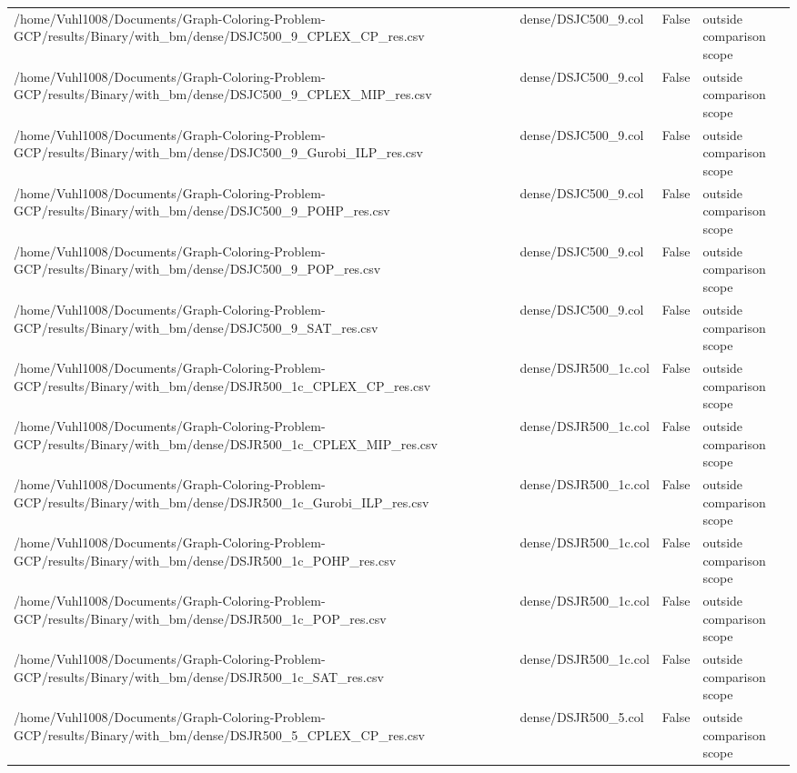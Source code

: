 \begin{table}[htbp]
\begin{tabular}{llll}
/home/Vuhl1008/Documents/Graph-Coloring-Problem-GCP/results/Binary/with\_bm/dense/DSJC500\_9\_CPLEX\_CP\_res.csv & dense/DSJC500\_9.col & False & outside comparison scope \\
/home/Vuhl1008/Documents/Graph-Coloring-Problem-GCP/results/Binary/with\_bm/dense/DSJC500\_9\_CPLEX\_MIP\_res.csv & dense/DSJC500\_9.col & False & outside comparison scope \\
/home/Vuhl1008/Documents/Graph-Coloring-Problem-GCP/results/Binary/with\_bm/dense/DSJC500\_9\_Gurobi\_ILP\_res.csv & dense/DSJC500\_9.col & False & outside comparison scope \\
/home/Vuhl1008/Documents/Graph-Coloring-Problem-GCP/results/Binary/with\_bm/dense/DSJC500\_9\_POHP\_res.csv & dense/DSJC500\_9.col & False & outside comparison scope \\
/home/Vuhl1008/Documents/Graph-Coloring-Problem-GCP/results/Binary/with\_bm/dense/DSJC500\_9\_POP\_res.csv & dense/DSJC500\_9.col & False & outside comparison scope \\
/home/Vuhl1008/Documents/Graph-Coloring-Problem-GCP/results/Binary/with\_bm/dense/DSJC500\_9\_SAT\_res.csv & dense/DSJC500\_9.col & False & outside comparison scope \\
/home/Vuhl1008/Documents/Graph-Coloring-Problem-GCP/results/Binary/with\_bm/dense/DSJR500\_1c\_CPLEX\_CP\_res.csv & dense/DSJR500\_1c.col & False & outside comparison scope \\
/home/Vuhl1008/Documents/Graph-Coloring-Problem-GCP/results/Binary/with\_bm/dense/DSJR500\_1c\_CPLEX\_MIP\_res.csv & dense/DSJR500\_1c.col & False & outside comparison scope \\
/home/Vuhl1008/Documents/Graph-Coloring-Problem-GCP/results/Binary/with\_bm/dense/DSJR500\_1c\_Gurobi\_ILP\_res.csv & dense/DSJR500\_1c.col & False & outside comparison scope \\
/home/Vuhl1008/Documents/Graph-Coloring-Problem-GCP/results/Binary/with\_bm/dense/DSJR500\_1c\_POHP\_res.csv & dense/DSJR500\_1c.col & False & outside comparison scope \\
/home/Vuhl1008/Documents/Graph-Coloring-Problem-GCP/results/Binary/with\_bm/dense/DSJR500\_1c\_POP\_res.csv & dense/DSJR500\_1c.col & False & outside comparison scope \\
/home/Vuhl1008/Documents/Graph-Coloring-Problem-GCP/results/Binary/with\_bm/dense/DSJR500\_1c\_SAT\_res.csv & dense/DSJR500\_1c.col & False & outside comparison scope \\
/home/Vuhl1008/Documents/Graph-Coloring-Problem-GCP/results/Binary/with\_bm/dense/DSJR500\_5\_CPLEX\_CP\_res.csv & dense/DSJR500\_5.col & False & outside comparison scope \\

\end{tabular}
\end{table}
